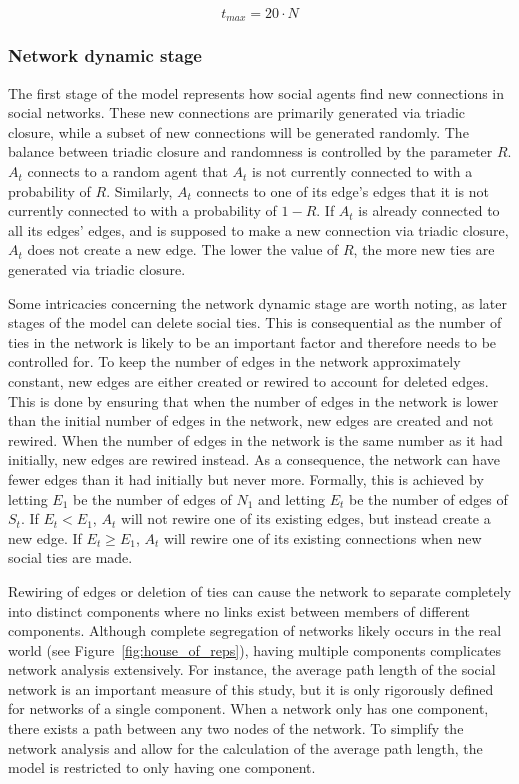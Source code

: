 \documentclass[11pt]{article}
\begin{document}
$$t_{max} = 20 \cdot N$$

\subsubsection{Network dynamic stage}
\label{network dynamic stage}
The first stage of the model represents how social agents find new connections in social networks. These new connections are primarily generated via triadic closure, while a subset of new connections will be generated randomly. The balance between triadic closure and randomness is controlled by the parameter $R$. $A_t$ connects to a random agent that $A_t$ is not currently connected to with a probability of $R$. 
Similarly, $A_t$ connects to one of its edge's edges that it is not currently connected to with a probability of $1-R$. If $A_t$ is already connected to all its edges' edges, and is supposed to make a new connection via triadic closure, $A_t$ does not create a new edge. The lower the value of $R$, the more new ties are generated via triadic closure. 

\noindent Some intricacies concerning the network dynamic stage are worth noting, as later stages of the model can delete social ties. This is consequential as the number of ties in the network is likely to be an important factor and therefore needs to be controlled for. 
To keep the number of edges in the network approximately constant, new edges are either created or rewired to account for deleted edges. 
This is done by ensuring that when the number of edges in the network is lower than the initial number of edges in the network, new edges are created and not rewired. When the number of edges in the network is the same number as it had initially, new edges are rewired instead. As a consequence, the network can have fewer edges than it had initially but never more. 
Formally, this is achieved by letting $E_1$ be the number of edges of $N_1$ and letting $E_t$ be the number of edges of $S_t$. 
If $E_t < E_1$, $A_t$ will not rewire one of its existing edges, but instead create a new edge. If $E_t \geq E_1$, $A_t$ will rewire one of its existing connections when new social ties are made.

\noindent Rewiring of edges or deletion of ties can cause the network to separate completely into distinct components where no links exist between members of different components. Although complete segregation of networks likely occurs in the real world (see Figure~\ref{fig:house_of_reps}), having multiple components complicates network analysis extensively. For instance, the average path length of the social network is an important measure of this study, but it is only rigorously defined for networks of a single component. When a network only has one component, there exists a path between any two nodes of the network. To simplify the network analysis and allow for the calculation of the average path length, the model is restricted to only having one component. 
\end{document}
